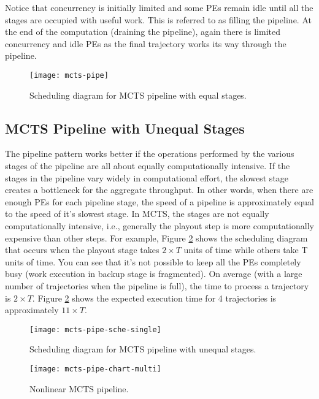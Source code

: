 \documentclass[10pt, conference, compsocconf]{IEEEtran}
\begin{document}
Notice that concurrency is initially limited and some PEs remain idle until all the stages are occupied with useful work. This is referred to as filling the pipeline. At the end of the computation (draining the pipeline), again there is limited concurrency and idle PEs as the final trajectory works its way through the pipeline. 





\begin{figure}
\centering
\texttt{[image: mcts-pipe]}
\caption{Scheduling diagram for MCTS pipeline with equal stages.}
\label{fig:mcts-pipe-1}
\end{figure}




\subsection{MCTS Pipeline with Unequal Stages}


The pipeline pattern works better if the operations performed by the various stages of the pipeline are all about equally computationally intensive. If the stages in the pipeline vary widely in computational effort, the slowest stage creates a bottleneck for the aggregate throughput. In other words, when there are enough PEs for each pipeline stage, the speed of a pipeline is approximately equal to the speed of it's slowest stage. In MCTS, the stages are not equally computationally intensive, i.e., generally the playout step is more computationally expensive than other steps.
For example, Figure \ref{fig:mcts-pipe-sche-single} shows the scheduling diagram that occurs when the playout stage takes $2\times T$ units of time while others take T units of time.  
You can see that it's not possible to keep all the PEs completely busy (work execution in backup stage is fragmented). On average (with a large number of trajectories when the pipeline is full), the time to process a trajectory is $2\times T$. Figure \ref{fig:mcts-pipe-sche-single} shows the expected execution time for 4 trajectories is approximately $11\times T$. 

\begin{figure}
\centering
\texttt{[image: mcts-pipe-sche-single]}
\caption{Scheduling diagram for MCTS pipeline with unequal stages.}
\label{fig:mcts-pipe-sche-single}
\end{figure}



\begin{figure}
\centering
\texttt{[image: mcts-pipe-chart-multi]}
\caption{Nonlinear MCTS pipeline.}
\label{fig:mcts-pipe-chart-multi}
\end{figure}
\end{document}
